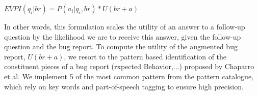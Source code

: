 \medskip
$EVPI(q_{i}|br) = P(a_{i}|q_{i},br) * U(br+a)$
\medskip

In other words, this formulation scales the utility of an answer to a follow-up question by the
likelihood we are to receive this answer, given the follow-up question and the bug report.
To compute the utility of the augmented bug report, $U(br+a)$, we resort to the pattern based
identification of the constituent pieces of a bug report (rxpected Behavior,...) proposed by Chaparro et al.
We implement 5 of the most common pattern from the pattern catalogue, which rely on key words
and part-of-speech tagging to ensure high precision.



%
%
%
